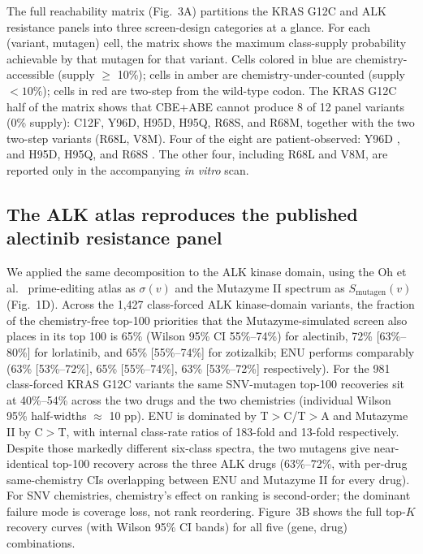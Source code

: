 \documentclass[11pt,a4paper]{article}
\begin{document}
The full reachability matrix (Fig.~3A) partitions the KRAS G12C and ALK
resistance panels into three screen-design categories at a glance. For
each (variant, mutagen) cell, the matrix shows the maximum class-supply
probability achievable by that mutagen for that variant. Cells colored in blue are
chemistry-accessible (supply $\geq$ 10\%); cells in amber are
chemistry-under-counted (supply $< 10\%$); cells in red are
two-step from the wild-type codon. The KRAS G12C
half of the matrix shows that CBE+ABE cannot produce 8 of 12 panel
variants (0\% supply): C12F, Y96D, H95D, H95Q, R68S, and R68M, together
with the two two-step variants (R68L, V8M). Four of the eight are
patient-observed: Y96D \citep{tanaka2021}, and H95D, H95Q, and R68S
\citep{awad2021}. The other four, including R68L and V8M, are
reported only in the accompanying \textit{in vitro} scan.

\subsection{The ALK atlas reproduces the published alectinib resistance panel}
\label{sec:alk-panel}

We applied the same decomposition to the ALK kinase domain, using
the Oh et al.\ \citeyearpar{oh2026} prime-editing atlas as $\sigma(v)$
and the Mutazyme II spectrum as $S_{\mathrm{mutagen}}(v)$ (Fig.~1D).
Across the 1,427 class-forced ALK kinase-domain variants, the fraction
of the chemistry-free top-100 priorities that the Mutazyme-simulated
screen also places in its top 100 is 65\% (Wilson 95\% CI 55\%--74\%)
for alectinib, 72\% [63\%--80\%] for lorlatinib, and 65\% [55\%--74\%]
for zotizalkib; ENU performs comparably (63\% [53\%--72\%], 65\%
[55\%--74\%], 63\% [53\%--72\%] respectively). For the 981
class-forced KRAS G12C variants the same SNV-mutagen top-100 recoveries
sit at 40\%--54\% across the two drugs and the two chemistries
(individual Wilson 95\% half-widths $\approx$ 10 pp). ENU is dominated
by T$>$C/T$>$A and Mutazyme II by C$>$T, with internal class-rate
ratios of 183-fold and 13-fold respectively. Despite those markedly
different six-class spectra, the two mutagens give near-identical
top-100 recovery across the three ALK drugs (63\%--72\%, with per-drug
same-chemistry CIs overlapping between ENU and Mutazyme II for every
drug). For SNV chemistries, chemistry's effect on ranking is
second-order; the dominant failure mode is coverage loss, not rank
reordering. Figure~3B shows the full top-$K$ recovery curves (with
Wilson 95\% CI bands) for all five (gene, drug) combinations.
\end{document}
